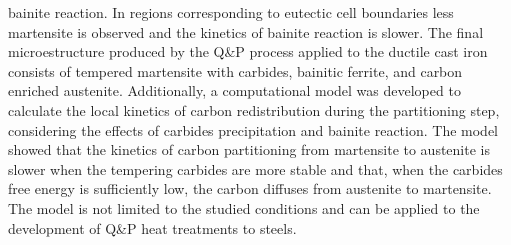 {bainite reaction. In regions corresponding to eutectic cell boundaries less martensite is observed and the kinetics of bainite reaction is slower. The final microestructure produced by the Q\&P process applied to the ductile cast iron consists of tempered martensite with carbides, bainitic ferrite, and carbon enriched austenite. Additionally, a computational model was developed to calculate the local kinetics of carbon redistribution during the partitioning step, considering the effects of carbides precipitation and bainite reaction. The model showed that the kinetics of carbon partitioning from martensite to austenite is slower when the tempering carbides are more stable and that, when the carbides free energy is sufficiently low, the carbon diffuses from austenite to martensite. The model is not limited to the studied conditions and can be applied to the development of Q\&P heat treatments to steels.
}


